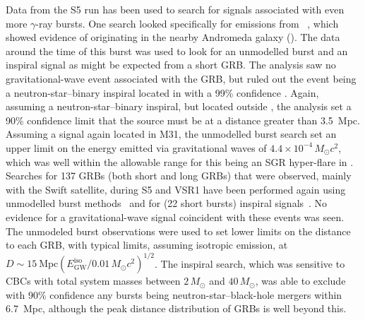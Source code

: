 \documentclass{article}
\begin{document}
Data from the S5 run has been used to search for signals associated with even
more $\gamma$-ray bursts. One search looked specifically for emissions from
~\cite{Golenetskii:2007a, Golenetskii:2007b}, which showed 
evidence of originating in the nearby Andromeda galaxy (). The data
around the time of this burst was used to look for an unmodelled burst and an
inspiral signal as might be expected from a short GRB. The analysis saw no
gravitational-wave event associated with the GRB, but ruled out the event being
a neutron-star--binary inspiral located in  with a 99\% confidence
\cite{Abbott:2008g}. Again, assuming a neutron-star--binary inspiral, but located
outside , the analysis set a 90\% confidence limit that the source must be at
a distance greater than 3.5~Mpc. Assuming a signal again located in M31, the
unmodelled burst search set an upper limit on the energy emitted via
gravitational waves of $4.4\times10^{-4}\,M_{\odot}c^2$, which was
well within the allowable range for this being an SGR hyper-flare in .
Searches for 137 GRBs (both short and long GRBs) that were observed, mainly with
the Swift satellite, during S5 and VSR1 have been performed again using
unmodelled burst methods~\cite{Abbott:2009d} and for (22 short bursts) inspiral
signals~\cite{Abadie:2010b}. No evidence for a gravitational-wave signal
coincident with these events was seen. The unmodeled burst observations were
used to set lower limits on the distance to each GRB, with typical limits,
assuming isotropic emission, at
$D\sim15\mathrm{\ Mpc}(E^{\mathrm{iso}}_{\mathrm{GW}}/0.01\,M_{\odot}c^2)^{1/2}$. The
inspiral search, which was sensitive to CBCs with total system masses
between $2\,M_{\odot}$ and $40\,M_{\odot}$, was able to exclude with
90\% confidence any bursts being neutron-star--black-hole mergers
within 6.7~Mpc, although the peak distance distribution of GRBs is
well beyond this.
\end{document}
